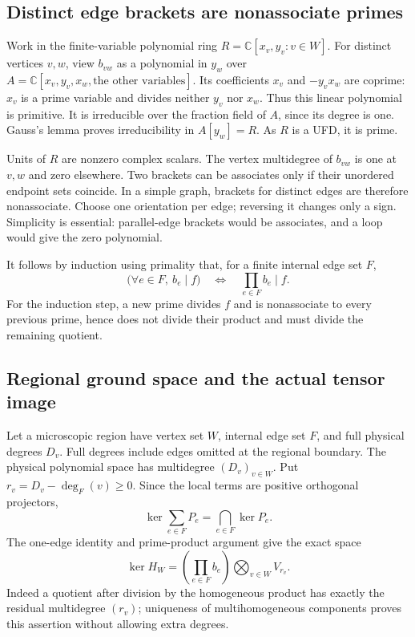 \subsection{Distinct edge brackets are nonassociate primes}

Work in the finite-variable polynomial ring
$R=\mathbb C[x_v,y_v:v\in W]$. For distinct vertices $v,w$, view
$b_{vw}$ as a polynomial in $y_w$ over
$A=\mathbb C[x_v,y_v,x_w,\text{the other variables}]$.
Its coefficients $x_v$ and $-y_vx_w$ are coprime: $x_v$ is a prime
variable and divides neither $y_v$ nor $x_w$. Thus this linear polynomial
is primitive. It is irreducible over the fraction field of $A$, since
its degree is one. Gauss's lemma proves irreducibility in $A[y_w]=R$.
As $R$ is a UFD, it is prime.

Units of $R$ are nonzero complex scalars. The vertex multidegree of
$b_{vw}$ is one at $v,w$ and zero elsewhere. Two brackets can be
associates only if their unordered endpoint sets coincide. In a simple
graph, brackets for distinct edges are therefore nonassociate. Choose
one orientation per edge; reversing it changes only a sign. Simplicity
is essential: parallel-edge brackets would be associates, and a loop
would give the zero polynomial.

It follows by induction using primality that, for a finite internal
edge set $F$,
\[
 \bigl(\forall e\in F,\ b_e\mid f\bigr)
 \quad\Longleftrightarrow\quad
 \prod_{e\in F}b_e\mid f.
\]
For the induction step, a new prime divides $f$ and is nonassociate to
every previous prime, hence does not divide their product and must
divide the remaining quotient.

\subsection{Regional ground space and the actual tensor image}

Let a microscopic region have vertex set $W$, internal edge set $F$,
and full physical degrees $D_v$. Full degrees include edges omitted at
the regional boundary. The physical polynomial space has multidegree
$(D_v)_{v\in W}$. Put $r_v=D_v-\deg_F(v)\geq0$.
Since the local terms are positive orthogonal projectors,
\[
 \ker\sum_{e\in F}P_e=\bigcap_{e\in F}\ker P_e.
\]
The one-edge identity and prime-product argument give the exact space
\begin{equation}
 \ker H_W
 =\left(\prod_{e\in F}b_e\right)
      \bigotimes_{v\in W}V_{r_v}.
 \label{urgent:regional-kernel}
\end{equation}
Indeed a quotient after division by the homogeneous product has exactly
the residual multidegree $(r_v)$; uniqueness of multihomogeneous
components proves this assertion without allowing extra degrees.


